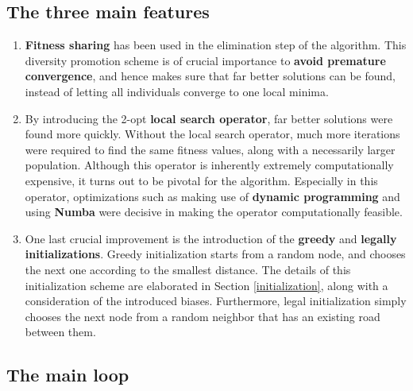 \documentclass[a4paper,10pt]{article}
\newcommand{\ReplaceMe}[1]{{\color{blue}#1}}
\begin{document}
\subsection{The three main features}
\begin{enumerate}
\item \textbf{Fitness sharing} has been used in the elimination step of the algorithm. This diversity promotion scheme is of crucial importance to \textbf{avoid premature convergence}, and hence makes sure that far better solutions can be found, instead of letting all individuals converge to one local minima.
\item By introducing the 2-opt \textbf{local search operator}, far better solutions were found more quickly. Without the local search operator, much more iterations were required to find the same fitness values, along with a necessarily larger population. Although this operator is inherently extremely computationally expensive, it turns out to be pivotal for the algorithm. Especially in this operator, optimizations such as making use of \textbf{dynamic programming} and using \textbf{Numba} were decisive in making the operator computationally feasible.
\item One last crucial improvement is the introduction of the \textbf{greedy} and \textbf{legally initializations}. Greedy initialization starts from a random node, and chooses the next one according to the smallest distance. The details of this initialization scheme are elaborated in Section \ref{initialization}, along with a consideration of the introduced biases. Furthermore, legal initialization simply chooses the next node from a random neighbor that has an existing road between them.
\end{enumerate}

\subsection{The main loop}

\end{document}
